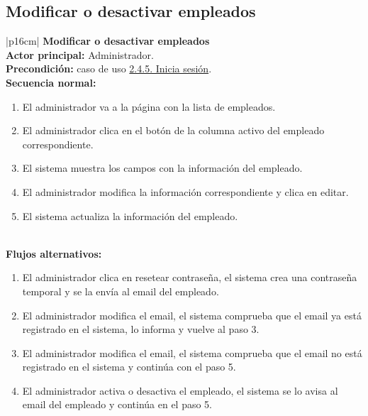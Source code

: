     \subsection{Modificar o desactivar empleados}
        \begin{longtable}{|p{16cm}|} 
        \hline
        \textbf{Modificar o desactivar empleados} \\ \hline
        \textbf{Actor principal:} Administrador. \\ \hline
        \textbf{Precondición:} caso de uso \hyperref[subsec:2.4.5.]{2.4.5. Inicia sesión}. \\ \hline
        \textbf{Secuencia normal:} \\
        \begin{minipage}[t]{\linewidth}
            \begin{enumerate}
                \item El administrador va a la página con la lista de empleados.
                \item El administrador clica en el botón de la columna activo del empleado correspondiente.
                \item El sistema muestra los campos con la información del empleado.
                \item El administrador modifica la información correspondiente y clica en editar.
                \item El sistema actualiza la información del empleado.
            \end{enumerate}
            \vspace{1mm}
        \end{minipage} \\ \hline
        \textbf{Flujos alternativos:} \\
        \begin{minipage}[t]{\linewidth}
            \begin{enumerate}
                \item[3.a.] El administrador clica en resetear contraseña, el sistema crea una contraseña temporal y se la envía al email del empleado.
                \item[4.a.] El administrador modifica el email, el sistema comprueba que el email ya está registrado en el sistema, lo informa y vuelve al paso 3.
                \item[4.b.] El administrador modifica el email, el sistema comprueba que el email no está registrado en el sistema y continúa con el paso 5.
                \item[4.c.] El administrador activa o desactiva el empleado, el sistema se lo avisa al email del empleado y continúa en el paso 5.
            \end{enumerate}
            \vspace{1mm}
        \end{minipage} \\ \hline
        \caption{Descripción general del caso de uso - Modificar o desactivar empleados.}
        \end{longtable}

